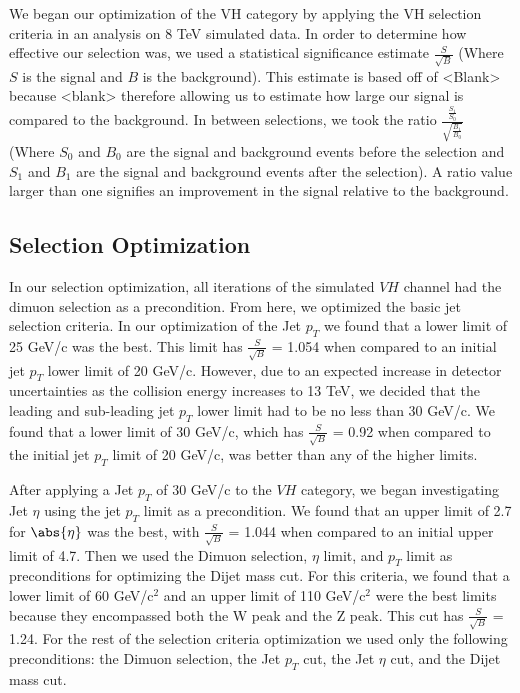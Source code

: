 \documentclass[12pt]{article}
\begin{document}
We began our optimization of the VH category by applying the VH selection criteria in an analysis on 8 TeV simulated data. 
In order to determine how effective our selection was, we used a statistical significance estimate $\frac{S}{\sqrt{B}}$ 
(Where $S$ is the signal and $B$ is the background). 
This estimate is based off of <Blank> because <blank> therefore allowing us to estimate how large our signal is compared to the background. 
In between selections, we took the ratio $\frac{\frac{S_{1}}{S_{0}}}{\sqrt{\frac{B_{1}}{B_{0}}}}$ 
(Where $S_{0}$ and $B_{0}$ are the signal and background events before the selection 
and $S_{1}$ and $B_{1}$ are the signal and background events after the selection). 
A ratio value larger than one signifies an improvement in the signal relative to the background.

\subsection{Selection Optimization}

In our selection optimization, all iterations of the simulated $VH$ channel had the dimuon selection as a precondition. 
From here, we optimized the basic jet selection criteria. In our optimization of the Jet $p_{T}$ we found that a lower limit of 25 GeV/c was the best. 
This limit has $\frac{S}{\sqrt{B}}$ = 1.054 when compared to an initial jet $p_{T}$ lower limit of 20 GeV/c. 
However, due to an expected increase in detector uncertainties as the collision energy increases to 13 TeV, 
we decided that the leading and sub-leading jet $p_{T}$ lower limit had to be no less than 30 GeV/c. 
We found that a lower limit of 30 GeV/c, which has $\frac{S}{\sqrt{B}}$ = 0.92 when compared to the initial jet $p_{T}$ limit of 20 GeV/c, 
was better than any of the higher limits. 

After applying a Jet $p_{T}$ of 30 GeV/c to the $VH$ category, we began investigating Jet $\eta$ using the jet $p_{T}$ limit as a precondition. 
We found that an upper limit of 2.7 for $\abs{\eta}$ was the best, with $\frac{S}{\sqrt{B}}$ = 1.044 when compared to an initial upper limit of 4.7. 
Then we used the Dimuon selection, $\eta$ limit, and $p_{T}$ limit as preconditions for optimizing the Dijet mass cut. 
For this criteria, we found that a lower limit of 60 GeV/c$^{2}$ and an upper limit of 110 GeV/c$^{2}$ were the best limits 
because they encompassed both the W peak and the Z peak. 
This cut has $\frac{S}{\sqrt{B}}$ = 1.24. For the rest of the selection criteria optimization we used only the following preconditions: 
the Dimuon selection, the Jet $p_{T}$ cut, the Jet $\eta$ cut, and the Dijet mass cut.
\end{document}
